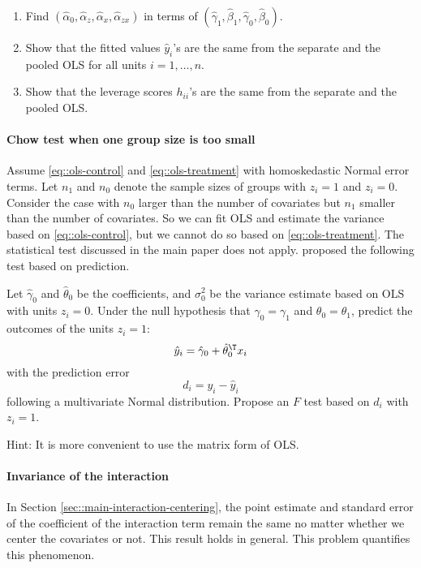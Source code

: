 \begin{enumerate}
\item
Find $(\hat{\alpha}_0, \hat{\alpha}_z, \hat{\alpha}_x, \hat{\alpha}_{zx})$ in terms of $ (  \hat{\gamma}_1, \hat{\beta}_1, \hat{\gamma}_0, \hat{\beta}_0 )$.
\item
Show that the fitted values $\hat y_i$'s are the same from the separate and the pooled OLS for all units $i=1, \ldots, n$. 
\item
Show that the leverage scores $h_{ii}$'s are the same from the separate and the pooled OLS. 
\end{enumerate}
 




\paragraph{Chow test when one group size is too small}\label{hw15interaction::chow-small}

Assume \eqref{eq::ols-control} and \eqref{eq::ols-treatment} with homoskedastic Normal error terms. 
Let $n_1$ and $n_0$ denote the sample sizes of groups with $z_i = 1$ and $z_i = 0$. Consider the case with $n_0$ larger than the number of covariates but $n_1$ smaller than the number of covariates. So we can fit OLS and estimate the variance based on \eqref{eq::ols-control}, but we cannot do so based on \eqref{eq::ols-treatment}. The statistical test discussed in the main paper does not apply. \citet{chow1960tests} proposed the following test based on prediction.


Let $\hat{\gamma}_0$ and $\hat{\theta}_0$ be the coefficients, and $\sigma^2_0$ be the variance estimate based on OLS with units $z_i = 0$. Under the null hypothesis that   $\gamma_0 = \gamma_1$ and $\theta_0 = \theta_1$,  predict the outcomes of the units $z_i=1$:
$$
\hat{y}_i = \hat{\gamma}_0 + \hat{\theta}_0^{\T} x_i 
$$
with the prediction error
$$
d_i = y_i - \hat{y}_i
$$
following a multivariate Normal distribution. Propose an $F$ test based on $d_i$ with $z_i = 1$. 


Hint: It is more convenient to use the matrix form of OLS. 


\paragraph{Invariance of the interaction}\label{hw15interaction::2X2-EHW}

In Section \ref{sec::main-interaction-centering}, the point estimate and standard error of the coefficient of the interaction term remain the same no matter whether we center the covariates or not. This result holds in general. This problem quantifies this phenomenon.


